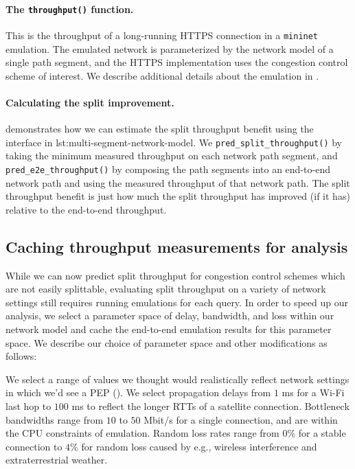 \paragraph{The \texttt{throughput()} function.}
This is the throughput of a long-running HTTPS connection in a
\texttt{mininet} emulation. The emulated network is parameterized
by the network model of a single path segment, and the HTTPS implementation
uses the congestion control scheme of interest. We describe additional details
about the emulation in .

\paragraph{Calculating the split improvement.}

 demonstrates how we can estimate the split
throughput benefit using the interface in \Cref
{lst:multi-segment-network-model}. We \texttt{pred\_split\_throughput()} by taking
the minimum measured throughput on each network path segment, and \texttt
{pred\_e2e\_throughput()} by composing the path segments into an end-to-end
network path and using the measured throughput of that network path. The split
throughput benefit is just how much the split throughput has improved (if it has)
relative to the end-to-end throughput.

\subsection{Caching throughput measurements for analysis}
\label{sec:splitting:heuristic:caching}

While we can now predict split throughput for congestion control schemes which
are not easily
splittable, evaluating split throughput on a variety of network settings still
requires running emulations for each query. In order to speed up our analysis,
we select a parameter space of delay, bandwidth, and loss within our network
model and cache the end-to-end emulation results for this parameter space. We
describe our choice of parameter space and other modifications as follows:



We select a range of values we thought would realistically reflect network
settings in which we'd see a PEP (). We select propagation
delays from $1$ ms for a Wi-Fi last hop to $100$ ms to reflect the longer RTTs
of a satellite connection. Bottleneck bandwidths range from $10$ to $50$ Mbit/s
for a single connection, and are within the CPU constraints of emulation. Random
loss rates range from $0\%$ for a stable connection to $4\%$ for random loss
caused by e.g., wireless interference and extraterrestrial weather.

